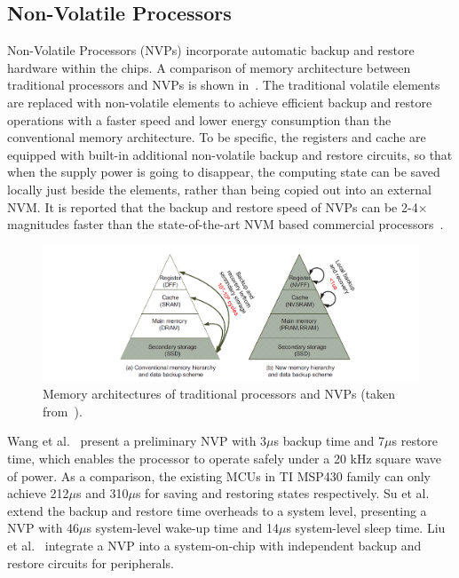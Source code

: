 \subsection{Non-Volatile Processors}

Non-Volatile Processors (NVPs) incorporate automatic backup and restore hardware within the chips. A comparison of memory architecture between traditional processors and NVPs is shown in~. The traditional volatile elements are replaced with non-volatile elements to achieve efficient backup and restore operations with a faster speed and lower energy consumption than the conventional memory architecture. To be specific, the registers and cache are equipped with built-in additional non-volatile backup and restore circuits, so that when the supply power is going to disappear, the computing state can be saved locally just beside the elements, rather than being copied out into an external NVM. It is reported that the backup and restore speed of NVPs can be 2-4$\times$ magnitudes faster than the state-of-the-art NVM based commercial processors~\cite{liu2015ambient}. 

\begin{figure}[!htb]
    \centering
    \includegraphics[width=12cm]{ch2_review/figures/nvp}
    \caption{Memory architectures of traditional processors and NVPs (taken from~\cite{liu2015ambient}).}
    \label{Figure:nvp}
\end{figure}

Wang et al.~\cite{wang20123us} present a preliminary NVP with 3$\mu$s backup time and 7$\mu$s restore time, which enables the processor to operate safely under a 20 kHz square wave of power. As a comparison, the existing MCUs in TI MSP430 family can only achieve 212$\mu$s and 310$\mu$s for saving and restoring states respectively. Su et al.~\cite{su2017ferroelectric} extend the backup and restore time overheads to a system level, presenting a NVP with 46$\mu$s system-level wake-up time and 14$\mu$s system-level sleep time. Liu et al.~\cite{liu2019130} integrate a NVP into a system-on-chip with independent backup and restore circuits for peripherals. 

